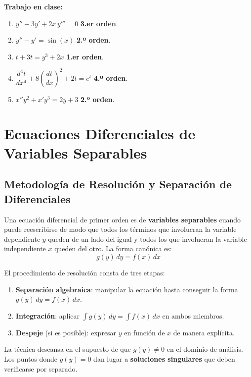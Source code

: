 \documentclass[12pt,letterpaper]{report}
\numberwithin{equation}{chapter}
\numberwithin{figure}{chapter}
\numberwithin{table}{chapter}
\begin{document}
\textbf{Trabajo en clase:}

\begin{enumerate}
    \item $y'' - 3y' + 2x\,y''' = 0$ \quad \textbf{3.er orden}.
    \item $y'' - y' = \sin(x)$ \quad \textbf{2.º orden}.
    \item $t + 3t = y^3 + 2x$ \quad \textbf{1.er orden}.
    \item $\dfrac{d^4 t}{dx^4} + 8\!\left(\dfrac{dt}{dx}\right)^2 + 2t = e^{t}$ \quad \textbf{4.º orden}.
    \item $x''y^2 + x'y^3 = 2y + 3$ \quad \textbf{2.º orden}.
\end{enumerate}


\section{Ecuaciones Diferenciales de Variables Separables}

\subsection{Metodología de Resolución y Separación de Diferenciales}

Una ecuación diferencial de primer orden es de \textbf{variables separables} cuando puede reescribirse de modo que todos los términos que involucran la variable dependiente $y$ queden de un lado del igual y todos los que involucran la variable independiente $x$ queden del otro. La forma canónica es:
\begin{equation*}
g(y)\,dy = f(x)\,dx
\end{equation*}

El procedimiento de resolución consta de tres etapas:

\begin{enumerate}
    \item \textbf{Separación algebraica}: manipular la ecuación hasta conseguir la forma $g(y)\,dy = f(x)\,dx$.
    \item \textbf{Integración}: aplicar $\displaystyle\int g(y)\,dy = \int f(x)\,dx$ en ambos miembros.
    \item \textbf{Despeje} (si es posible): expresar $y$ en función de $x$ de manera explícita.
\end{enumerate}

La técnica descansa en el supuesto de que $g(y) \neq 0$ en el dominio de análisis. Los puntos donde $g(y) = 0$ dan lugar a \textbf{soluciones singulares} que deben verificarse por separado.
\end{document}
